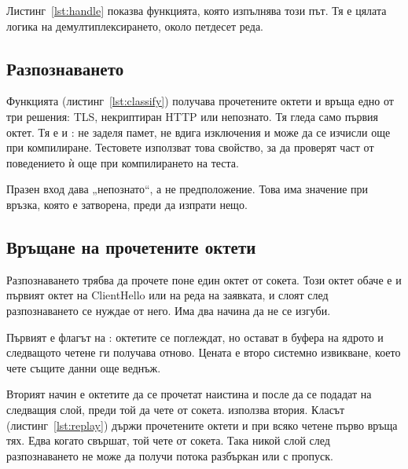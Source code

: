 Листинг~\ref{lst:handle} показва функцията, която изпълнява този път. Тя е цялата логика
на демултиплексирането, около петдесет реда.



\subsection{Разпознаването}

Функцията  (листинг~\ref{lst:classify}) получава прочетените октети и
връща едно от три решения: TLS, некриптиран HTTP или непознато. Тя гледа само първия
октет. Тя е  и : не заделя памет, не вдига изключения и
може да се изчисли още при компилиране. Тестовете използват това свойство, за да
проверят част от поведението ѝ още при компилирането на теста.



Празен вход дава „непознато“, а не предположение. Това има значение при връзка, която е
затворена, преди да изпрати нещо.

\subsection{Връщане на прочетените октети}

Разпознаването трябва да прочете поне един октет от сокета. Този октет обаче е и първият
октет на ClientHello или на реда на заявката, и слоят след разпознаването се нуждае от
него. Има два начина да не се изгуби.

Първият е флагът  на : октетите се поглеждат, но остават в
буфера на ядрото и следващото четене ги получава отново. Цената е второ системно
извикване, което чете същите данни още веднъж.

Вторият начин е октетите да се прочетат наистина и после да се подадат на следващия
слой, преди той да чете от сокета.  използва втория. Класът
 (листинг~\ref{lst:replay}) държи прочетените октети и при всяко
четене първо връща тях. Едва когато свършат, той чете от сокета. Така никой слой след
разпознаването не може да получи потока разбъркан или с пропуск.

